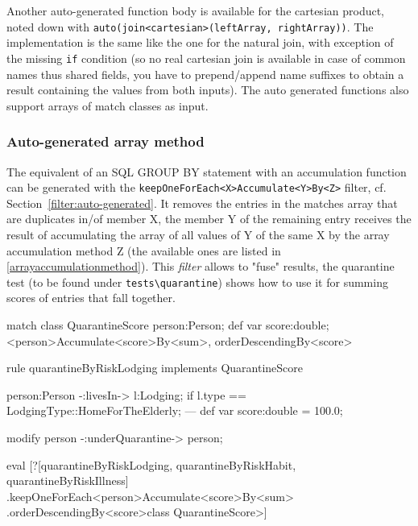 Another auto-generated function body is available for the cartesian product, noted down with \texttt{auto(join<cartesian>(leftArray, rightArray))}.
The implementation is the same like the one for the natural join, with exception of the missing \texttt{if} condition (so no real cartesian join is available in case of common names thus shared fields, you have to prepend/append name suffixes to obtain a result containing the values from both inputs).
The auto generated functions also support arrays of match classes as input.

\subsubsection*{Auto-generated array method}

The equivalent of an SQL GROUP BY statement with an accumulation function can be generated with the \texttt{keepOneForEach<X>Accumulate<Y>By<Z>} filter, cf. Section~\ref{filter:auto-generated}.
It removes the entries in the matches array that are duplicates in/of member X, the member Y of the remaining entry receives the result of accumulating the array of all values of Y of the same X by the array accumulation method Z (the available ones are listed in \ref{arrayaccumulationmethod}).
This \emph{filter} allows to "fuse" results, the quarantine test (to be found under \verb#tests\quarantine#) shows how to use it for summing scores of entries that fall together.

\begin{example}
  \begin{grgen}
match class QuarantineScore
{
	person:Person;
	def var score:double;
} \keepOneForEach<person>Accumulate<score>By<sum>, orderDescendingBy<score>

rule quarantineByRiskLodging implements QuarantineScore
{
	person:Person -:livesIn-> l:Lodging;
	if { l.type == LodgingType::HomeForTheElderly; }
---
	def var score:double = 100.0;
	
	modify {
		person -:underQuarantine-> person;
	}
}
  \end{grgen}\label{exkeeponeforeachaccumulatebyfilter}

	\begin{grshell}
	eval [?[quarantineByRiskLodging, quarantineByRiskHabit, quarantineByRiskIllness]
		\QuarantineScore.keepOneForEach<person>Accumulate<score>By<sum>
		\QuarantineScore.orderDescendingBy<score>\<class QuarantineScore>]
	\end{grshell}
\end{example}

